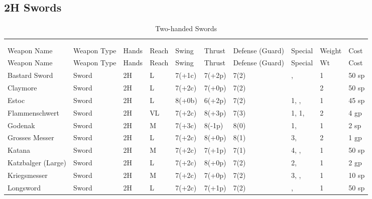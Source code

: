 \documentclass[oneside,11pt,english]{book}
\begin{document}
\subsection{2H Swords}\vspace{-15pt}
\begin{longtabu} to 1\linewidth {X[2,l]XX[-1,c]X[-1,c]XXX[-1,c]X[2,l]X[-3,c]X[-3,r]}
	\captionsetup{labelformat=blank,textformat=empty}
	\caption{Two-handed Swords}\vspace{-15pt}\\
	\label{tab:2H Swords}\\
		Weapon Name						&Weapon Type	&Hands&Reach&Swing&Thrust&Defense (Guard)&Special						&Weight	&Cost\\\toprule\endfirsthead
Weapon Name					&Weapon Type	&Hands	&Reach	&Swing	&Thrust	&Defense (Guard)	&Special						&Wt		&Cost\\\toprule\endhead
Bastard Sword				&Sword			&2H		&L		&7(+1c)	&7(+2p)	&7(2)				&,  			&1		&50 sp\\
Claymore					&Sword			&2H		&L		&7(+2c)	&7(+0p)	&7(2)	& &2 &50 sp\\
Estoc						&Sword 			&2H		&L		&8(+0b)	&6(+2p)	&7(2)	& 1, , 			&1		&45 sp\\
Flammenschwert				&Sword			&2H		&VL		&7(+2c)	&8(+3p)	&7(3)	& 1,  1, 				&2		&4 gp\\
Godenak &Sword &2H &M &7(+3c) &8(-1p) &8(0) & 1,  &1 &2 sp\\
Grosses Messer &Sword &2H &L &7(+2c) &8(+0p) &8(1) & 3,  &2 &1 gp\\
Katana 					&Sword &2H &M 	&7(+2c) &7(+1p) &7(1) & 4, ,  			&1 	&50 sp\\
Katzbalger (Large) 		&Sword &2H &L 	&7(+2c) &8(+0p) &7(2) & 2,  				&1 	&2 gp \\
Kriegsmesser 			&Sword &2H &M 	&7(+2c) &7(+0p) &7(2) & 3, ,  			&1 	&10 sp\\
Longsword 				&Sword &2H &L 	&7(+2c) &7(+1p) &7(2) &,  					&1 	&50 sp\\

\end{longtabu}
\end{document}
